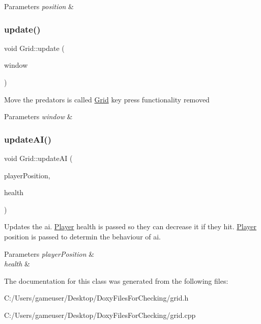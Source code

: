 \begin{DoxyParams}{Parameters}
{\em position} & \\
\hline
\end{DoxyParams}
\mbox{\label{class_grid_a3663bc64d98e521de255d42a971072cc}} 
\subsubsection{\texorpdfstring{update()}{update()}}
{\footnotesize\ttfamily void Grid\+::update (\begin{DoxyParamCaption}\item[{sf\+::\+Render\+Window \&}]{window }\end{DoxyParamCaption})}



Move the predators is called \mbox{\hyperlink{class_grid}{Grid}} key press functionality removed 


\begin{DoxyParams}{Parameters}
{\em window} & \\
\hline
\end{DoxyParams}
\mbox{\label{class_grid_aed35b0297be5c00ed36e8d27e525fdaa}} 
\subsubsection{\texorpdfstring{updateAI()}{updateAI()}}
{\footnotesize\ttfamily void Grid\+::update\+AI (\begin{DoxyParamCaption}\item[{sf\+::\+Vector2f}]{player\+Position,  }\item[{int \&}]{health }\end{DoxyParamCaption})}



Updates the ai. \mbox{\hyperlink{class_player}{Player}} health is passed so they can decrease it if they hit. \mbox{\hyperlink{class_player}{Player}} position is passed to determin the behaviour of ai. 


\begin{DoxyParams}{Parameters}
{\em player\+Position} & \\
\hline
{\em health} & \\
\hline
\end{DoxyParams}


The documentation for this class was generated from the following files\+:\begin{DoxyCompactItemize}
\item 
C\+:/\+Users/gameuser/\+Desktop/\+Doxy\+Files\+For\+Checking/grid.\+h\item 
C\+:/\+Users/gameuser/\+Desktop/\+Doxy\+Files\+For\+Checking/grid.\+cpp\end{DoxyCompactItemize}
